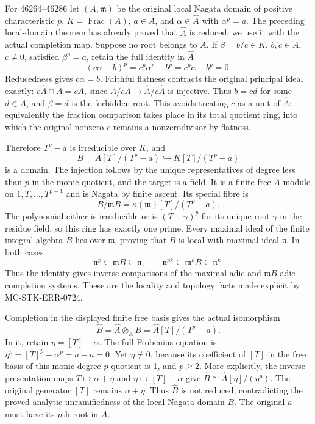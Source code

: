 For 46264--46286 let \((A,\mathfrak m)\) be the original local Nagata domain of positive characteristic \(p\), \(K=\operatorname{Frac}(A)\), \(a\in A\), and \(\alpha\in\widehat A\) with \(\alpha^p=a\). The preceding local-domain theorem has already proved that \(\widehat A\) is reduced; we use it with the actual completion map. Suppose no root belongs to \(A\). If \(\beta=b/c\in K\), \(b,c\in A\), \(c\ne0\), satisfied \(\beta^p=a\), retain the full identity in \(\widehat A\) \[
 (c\alpha-b)^p=c^p\alpha^p-b^p=c^pa-b^p=0.
\] Reducedness gives \(c\alpha=b\). Faithful flatness contracts the original principal ideal exactly: \(c\widehat A\cap A=cA\), since \(A/cA\to\widehat A/c\widehat A\) is injective. Thus \(b=cd\) for some \(d\in A\), and \(\beta=d\) is the forbidden root. This avoids treating \(c\) as a unit of \(\widehat A\); equivalently the fraction comparison takes place in its total quotient ring, into which the original nonzero \(c\) remains a nonzerodivisor by flatness.

Therefore \(T^p-a\) is irreducible over \(K\), and \[
 B=A[T]/(T^p-a)\hookrightarrow K[T]/(T^p-a)
\] is a domain. The injection follows by the unique representatives of degree less than \(p\) in the monic quotient, and the target is a field. It is a finite free \(A\)-module on \(1,T,\ldots,T^{p-1}\) and is Nagata by finite ascent. Its special fibre is \[
 B/\mathfrak mB=\kappa(\mathfrak m)[T]/(T^p-\overline a).
\] The polynomial either is irreducible or is \((T-\gamma)^p\) for its unique root \(\gamma\) in the residue field, so this ring has exactly one prime. Every maximal ideal of the finite integral algebra \(B\) lies over \(\mathfrak m\), proving that \(B\) is local with maximal ideal \(\mathfrak n\). In both cases \[
 \mathfrak n^p\subseteq\mathfrak mB\subseteq\mathfrak n,
 \qquad\mathfrak n^{pk}\subseteq\mathfrak m^kB\subseteq\mathfrak n^k.
\] Thus the identity gives inverse comparisons of the maximal-adic and \(\mathfrak mB\)-adic completion systems. These are the locality and topology facts made explicit by MC-STK-ERR-0724.

Completion in the displayed finite free basis gives the actual isomorphism \[
 \widehat B=\widehat A\otimes_A B
 =\widehat A[T]/(T^p-a).
\] In it, retain \(\eta=[T]-\alpha\). The full Frobenius equation is \(\eta^p=[T]^p-\alpha^p=a-a=0\). Yet \(\eta\ne0\), because its coefficient of \([T]\) in the free basis of this monic degree-\(p\) quotient is 1, and \(p\geq2\). More explicitly, the inverse presentation maps \(T\mapsto\alpha+\eta\) and \(\eta\mapsto[T]-\alpha\) give \(\widehat B\cong\widehat A[\eta]/(\eta^p)\). The original generator \([T]\) remains \(\alpha+\eta\). Thus \(\widehat B\) is not reduced, contradicting the proved analytic unramifiedness of the local Nagata domain \(B\). The original \(a\) must have its \(p\)th root in \(A\).

